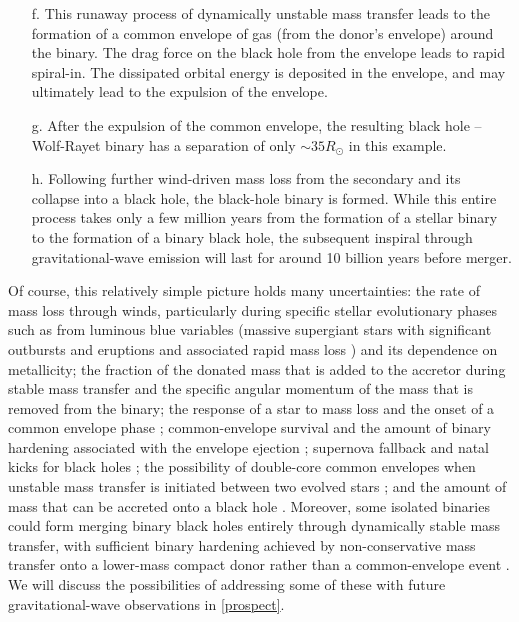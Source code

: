 \documentclass[review]{elsarticle}
\begin{document}
\begin{enumerate}
\item[f.] This runaway process of dynamically unstable mass transfer leads to the formation of a common envelope of gas (from the donor's envelope) around the binary.  The drag force on the black hole from the envelope leads to rapid spiral-in.   The dissipated orbital energy is deposited in the envelope, and may ultimately lead to the expulsion of the envelope.  
\item[g.] After the expulsion of the common envelope, the resulting black hole -- Wolf-Rayet binary has a separation of only $\sim 35 R_\odot$ in this example.  
\item[h.] Following further wind-driven mass loss from the secondary and its collapse into a black hole, the black-hole binary is formed.  While this entire process takes only a few million years from the formation of a stellar binary to the formation of a binary black hole, the subsequent inspiral through gravitational-wave emission will last for around 10 billion years before merger.
\end{enumerate}

Of course, this relatively simple picture holds many uncertainties: the rate of mass loss through winds, particularly during specific stellar evolutionary phases such as from luminous blue variables (massive supergiant stars with significant outbursts and eruptions and associated rapid mass loss \citep{Mennekens:2014})  and its dependence on metallicity; the fraction of the donated mass that is added to the accretor during stable mass transfer \citep{KippenhahnMeyerHofmeister:1977} and the specific angular momentum of the mass that is removed from the binary; the response of a star to mass loss and the onset of a common envelope phase \citep{Pavlovskii:2017}; common-envelope survival and the amount of binary hardening associated with the envelope ejection \citep[e.g.,][]{Kruckow:2016,Klencki:2020convective,Fragos:2019,LawSmith:2020,Lau:2021}; supernova fallback and natal kicks for black holes \citep[e.g.,][]{Fryer:2012,Repetto:2012,Mandel:2015kicks,Mueller:2020}; the possibility of double-core common envelopes when unstable mass transfer is initiated between two evolved stars \citep{BetheBrown:1998,Dewi:2006}; and the amount of mass that can be accreted onto a black hole \citep{Eldridge:2017,Bavera:2020,vanSon:2020}.  Moreover, some isolated binaries could form merging binary black holes entirely through dynamically stable mass transfer, with sufficient binary hardening achieved by non-conservative mass transfer onto a lower-mass compact donor rather than a common-envelope event \citep{vandenHeuvel:2017,Pavlovskii:2017,Neijssel:2018,vanSon:2021}.  We will discuss the possibilities of addressing some of these with future gravitational-wave observations in \autoref{prospect}.
\end{document}

